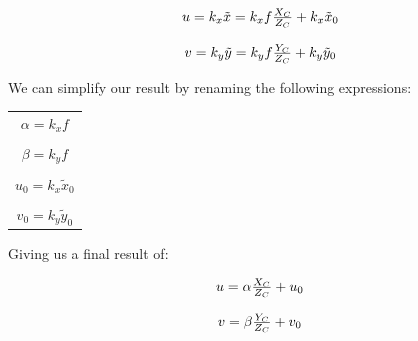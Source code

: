 \documentclass[]{article}
\begin{document}
\begin{center}
\begin{equation}
\begin{tabular}{c}
  $u = k_x\tilde{x} = k_xf\frac{X_C}{Z_C} + k_x\tilde{x}_0$\\
  \\
  $v = k_y\tilde{y} = k_yf\frac{Y_C}{Z_C} + k_y\tilde{y}_0$
\end{tabular}
\end{equation}
\end{center}

We can simplify our result by renaming the following expressions:
\begin{center}
\begin{tabular}{c}
$\alpha = k_xf$\\
\\
$\beta = k_yf$\\
\\
$u_0 = k_x\tilde{x}_0$\\
\\
$v_0 = k_y\tilde{y}_0$
\end{tabular}
\end{center}

Giving us a final result of:

\begin{center}
\begin{equation}
\begin{tabular}{c}
  $u = \alpha\frac{X_C}{Z_C} + u_0$\\
  \\
  $v = \beta\frac{Y_C}{Z_C} + v_0$
\end{tabular}
\end{equation}
\end{center}
\end{document}
